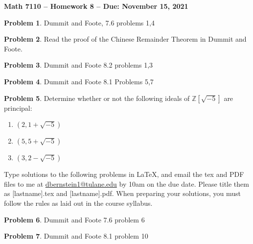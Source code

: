 \documentclass[letterpaper,11pt]{amsart}
\theoremstyle{plain}
\theoremstyle{definition}
\newtheorem{pr}{Problem}
\theoremstyle{remark}
\begin{document}
\Large

\begin{center}
{\bf Math 7110 -- Homework  8 --  Due:  November 15, 2021}
\end{center}

\normalsize


\medskip

\color{red}

\color{black}


\begin{pr}
    Dummit and Foote, 7.6 problems 1,4
\end{pr}

\begin{pr}
    Read the proof of the Chinese Remainder Theorem in Dummit and Foote.
\end{pr}

\begin{pr}
    Dummit and Foote 8.2 problems 1,3
\end{pr}


\begin{pr}
    Dummit and Foote 8.1 Problems 5,7
\end{pr}

\begin{pr}
    Determine whether or not the following ideals of $\mathbb{Z}[\sqrt{-5}]$ are principal:
    \begin{enumerate}
        \item $(2,1+\sqrt{-5})$
        \item $(5,5+\sqrt{-5})$
        \item $(3,2-\sqrt{-5})$
    \end{enumerate}
\end{pr}



\bigskip

Type solutions to the following problems in \LaTeX, and email the tex and PDF files to me at \url{dbernstein1@tulane.edu} by 10am on the due date.
Please title them as [lastname].tex and [lastname].pdf.
When preparing your solutions, you must follow the rules as laid out in the course syllabus.

\vspace{.5cm}


\begin{pr}
    Dummit and Foote 7.6 problem 6
\end{pr}

\begin{pr}
    Dummit and Foote 8.1 problem 10    
\end{pr}
\end{document}
